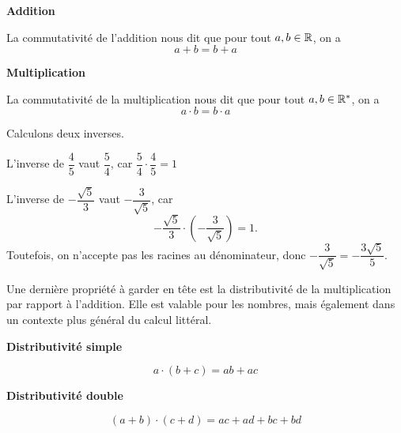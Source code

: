 \documentclass[a4paper,12pt]{report}
\begin{document}
\begin{description}[leftmargin= 2cm]
		\begin{minipage}[t]{0.4\textwidth}{
		\vspace{0pt}
		{\bfseries Addition}

		La commutativité de l'addition nous dit que pour tout $a,b\in \mathbb R$, on a
		\[a+b=b+a\]
		}
		\end{minipage}
		\hfill
		\begin{minipage}[t]{0.4\textwidth}{
		\vspace{0pt}
		{\bfseries Multiplication}
	
		La commutativité de la multiplication nous dit que pour tout $a,b\in \mathbb R^*$, on a
		\[a\cdot b=b\cdot a\]
	}
		\end{minipage}
\end{description}
\begin{rem}
Calculons deux inverses.

\begin{minipage}[t]{0.4\textwidth}{
\vspace{0pt}
L'inverse de $\dfrac{4}{5}$ vaut $\dfrac{5}{4}$, car $\dfrac{5}{4}\cdot \dfrac{4}{5}=1$}
\end{minipage}
\hfill
\begin{minipage}[t]{0.5\textwidth}{
\vspace{0pt}
L'inverse de $-\dfrac{\sqrt{5}}{3}$ vaut $-\dfrac{3}{\sqrt{5}}$, car
\[-\dfrac{\sqrt{5}}{3}\cdot (-\dfrac{3}{\sqrt{5}})=1.\]
Toutefois, on n'accepte pas les racines au dénominateur, donc $-\dfrac{3}{\sqrt{5}}=-\dfrac{3\sqrt{5}}{5}$.
}
\end{minipage}
\end{rem}
Une dernière propriété à garder en tête est la distributivité de la multiplication par rapport à l'addition. 
Elle est valable pour les nombres, mais également dans un contexte plus général du calcul littéral.

\begin{minipage}[t]{0.4\textwidth}{
\vspace{0pt}
\begin{center}
{\bfseries Distributivité simple}

\end{center}
\[a\cdot (b+c)=ab+ac\]
}\end{minipage}
\hfill
\begin{minipage}[t]{0.5\textwidth}{
\vspace{0pt}
\begin{center}
{\bfseries Distributivité double}

\end{center}
\[(a+b)\cdot (c+d)= ac+ad+bc+bd\]
}\end{minipage}
\end{document}
